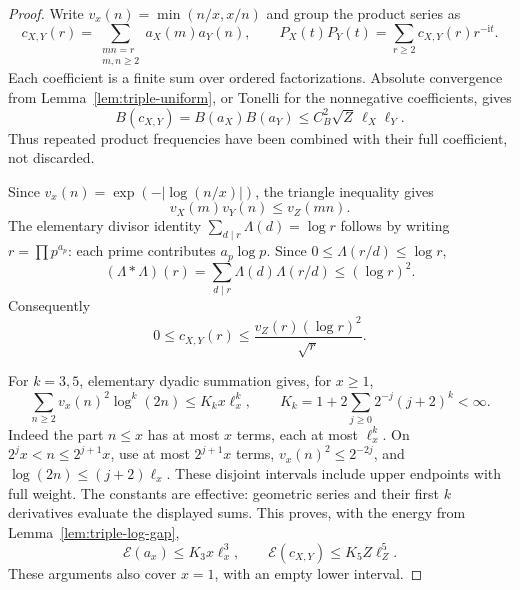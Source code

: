 \documentclass[11pt]{article}
\newcommand{\ii}{\mathrm i}
\begin{document}
\begin{proof}
Write \(v_x(n)=\min(n/x,x/n)\) and group the product series as
\begin{equation}\label{eq:triple-convolution}
 c_{X,Y}(r)=\sum_{\substack{mn=r\\m,n\geq2}}a_X(m)a_Y(n),\qquad
 P_X(t)P_Y(t)=\sum_{r\geq2}c_{X,Y}(r)r^{-\ii t}.
\end{equation}
Each coefficient is a finite sum over ordered factorizations.
Absolute convergence from Lemma~\ref{lem:triple-uniform}, or Tonelli
for the nonnegative coefficients, gives
\[
 B(c_{X,Y})=B(a_X)B(a_Y)
 \leq C_B^2\sqrt Z\,\ell_X\ell_Y.
\]
Thus repeated product frequencies have been combined with their full
coefficient, not discarded.

Since \(v_x(n)=\exp(-|\log(n/x)|)\), the triangle inequality gives
\begin{equation}\label{eq:triple-weight-product}
 v_X(m)v_Y(n)\leq v_Z(mn).
\end{equation}
The elementary divisor identity
\(\sum_{d\mid r}\Lambda(d)=\log r\) follows by writing
\(r=\prod p^{a_p}\): each prime contributes \(a_p\log p\).
Since \(0\leq\Lambda(r/d)\leq\log r\),
\[
 (\Lambda*\Lambda)(r)=\sum_{d\mid r}\Lambda(d)\Lambda(r/d)
 \leq(\log r)^2.
\]
Consequently
\begin{equation}\label{eq:triple-convolution-envelope}
 0\leq c_{X,Y}(r)
 \leq \frac{v_Z(r)(\log r)^2}{\sqrt r}.
\end{equation}

For \(k=3,5\), elementary dyadic summation gives, for \(x\geq1\),
\begin{equation}\label{eq:triple-dyadic-moment}
 \sum_{n\geq2}v_x(n)^2\log^k(2n)
 \leq K_kx\ell_x^k,\qquad
 K_k=1+2\sum_{j\geq0}2^{-j}(j+2)^k<\infty.
\end{equation}
Indeed the part \(n\leq x\) has at most \(x\) terms, each at most
\(\ell_x^k\). On \(2^jx<n\leq2^{j+1}x\), use at most \(2^{j+1}x\)
terms, \(v_x(n)^2\leq2^{-2j}\), and
\(\log(2n)\leq(j+2)\ell_x\). These disjoint intervals include upper
endpoints with full weight. The constants are effective: geometric
series and their first \(k\) derivatives evaluate the displayed sums.
This proves, with the energy from Lemma~\ref{lem:triple-log-gap},
\begin{equation}\label{eq:triple-coefficient-energies}
 \mathcal E(a_x)\leq K_3x\ell_x^3,\qquad
 \mathcal E(c_{X,Y})\leq K_5Z\ell_Z^5.
\end{equation}
These arguments also cover \(x=1\), with an empty lower interval.


\end{proof}
\end{document}
